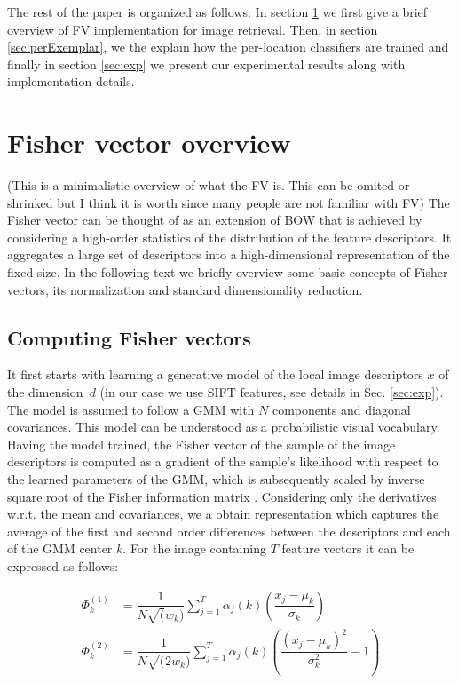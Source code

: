 \documentclass[table]{article} %
\begin{document}
	The rest of the paper is organized as follows:
	In section \ref{sec:FV} we first give a brief overview of FV implementation for image retrieval. Then, in section \ref{sec:perExemplar}, we the explain how the per-location classifiers are trained  and finally in section \ref{sec:exp} we present our experimental results along with implementation details.

\section{Fisher vector overview}
\label{sec:FV}
	\textcolor{myRed}{(This is a minimalistic overview of what the FV is. This can be omited or shrinked but I think it is worth since many people are not familiar with FV)}\newline
	The Fisher vector can be thought of as an extension of BOW \cite{Sivic2003} that is achieved by considering a high-order statistics of the distribution of the feature descriptors. It aggregates a large set of descriptors into a high-dimensional representation of the fixed size. In the following text we briefly overview some basic concepts of Fisher vectors, its normalization and standard dimensionality reduction.

	\subsection{Computing Fisher vectors}
		It first starts with learning a generative model of the local image descriptors $x$ of the dimension~$d$ (in our case we use SIFT features, see details in Sec. \ref{sec:exp}). The model is assumed to follow a GMM with $N$ components and diagonal covariances. This model can be understood as a probabilistic visual vocabulary. Having the model trained, the Fisher vector of the sample of the image descriptors is computed as a gradient of the sample's likelihood with respect to the learned parameters of the GMM, which is subsequently scaled by inverse square root of the Fisher information matrix \cite{Perronnin2007}. Considering only the derivatives w.r.t. the mean and covariances, we a obtain representation which captures the average of the first and second order differences between the descriptors and each of the GMM center $k$. For the image containing $T$ feature vectors it can be expressed as follows:
		
		\begin{align}
			\Phi^{(1)}_k&=
			\dfrac{1}{N \sqrt(w_k)}\sum_{j=1}^{T} \alpha_j(k) \left(
			\dfrac{x_j-\mu_k}{\sigma_k}
			\right)
			\label{eq:FVmean}
			\\
			\Phi^{(2)}_k&=
			\dfrac{1}{N \sqrt(2w_k)}\sum_{j=1}^{T} \alpha_j(k) \left(
			\dfrac{(x_j-\mu_k)^2}{\sigma_k^2}-1 
			\right)
			\label{eq:FVvar}
		\end{align}
\end{document}
